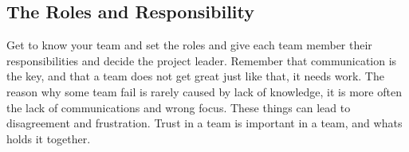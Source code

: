 \subsection{The Roles and Responsibility}
\label{sec:rolesAndResponsibility}
Get to know your team and set the roles and give each team member their responsibilities  and decide the project leader. Remember that communication is the key, and that a team does not get great just like that, it needs work. The reason why some team fail is rarely caused by lack of knowledge, it is more often the lack of communications and wrong focus. These things can lead to disagreement and frustration. Trust in a team is important in a team, and whats holds it together. \cite[P.~144, P.~155-157]{ProjectManagement}


